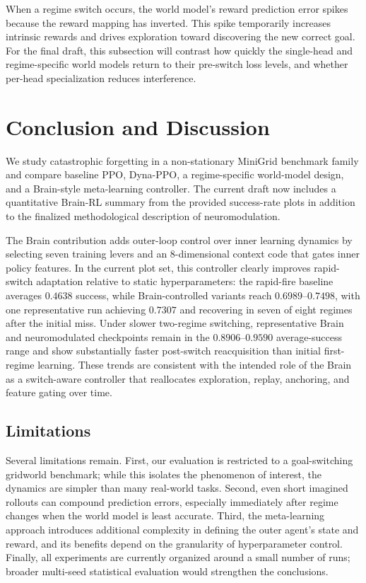 ﻿\documentclass[sigconf]{acmart}
\begin{document}
When a regime switch occurs, the world model's reward prediction error spikes because the reward mapping has inverted. This spike temporarily increases intrinsic rewards and drives exploration toward discovering the new correct goal. For the final draft, this subsection will contrast how quickly the single-head and regime-specific world models return to their pre-switch loss levels, and whether per-head specialization reduces interference.

\section{Conclusion and Discussion}
\label{sec:conclusion}
We study catastrophic forgetting in a non-stationary MiniGrid benchmark family and compare baseline PPO, Dyna-PPO, a regime-specific world-model design, and a Brain-style meta-learning controller. The current draft now includes a quantitative Brain-RL summary from the provided success-rate plots in addition to the finalized methodological description of neuromodulation.

The Brain contribution adds outer-loop control over inner learning dynamics by selecting seven training levers and an 8-dimensional context code that gates inner policy features. In the current plot set, this controller clearly improves rapid-switch adaptation relative to static hyperparameters: the rapid-fire baseline averages $0.4638$ success, while Brain-controlled variants reach $0.6989$--$0.7498$, with one representative run achieving $0.7307$ and recovering in seven of eight regimes after the initial miss. Under slower two-regime switching, representative Brain and neuromodulated checkpoints remain in the $0.8906$--$0.9590$ average-success range and show substantially faster post-switch reacquisition than initial first-regime learning. These trends are consistent with the intended role of the Brain as a switch-aware controller that reallocates exploration, replay, anchoring, and feature gating over time.

\subsection{Limitations}
Several limitations remain. First, our evaluation is restricted to a goal-switching gridworld benchmark; while this isolates the phenomenon of interest, the dynamics are simpler than many real-world tasks. Second, even short imagined rollouts can compound prediction errors, especially immediately after regime changes when the world model is least accurate. Third, the meta-learning approach introduces additional complexity in defining the outer agent's state and reward, and its benefits depend on the granularity of hyperparameter control. Finally, all experiments are currently organized around a small number of runs; broader multi-seed statistical evaluation would strengthen the conclusions.
\end{document}
